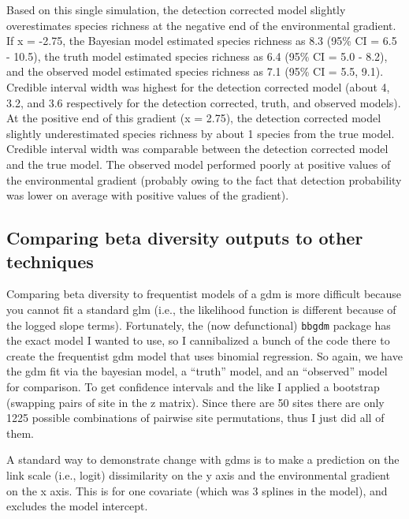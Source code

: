\documentclass[
]{article}
\begin{document}
Based on this single simulation, the detection corrected model slightly
overestimates species richness at the negative end of the environmental
gradient. If x = -2.75, the Bayesian model estimated species richness as
8.3 (95\% CI = 6.5 - 10.5), the truth model estimated species richness
as 6.4 (95\% CI = 5.0 - 8.2), and the observed model estimated species
richness as 7.1 (95\% CI = 5.5, 9.1). Credible interval width was
highest for the detection corrected model (about 4, 3.2, and 3.6
respectively for the detection corrected, truth, and observed models).
At the positive end of this gradient (x = 2.75), the detection corrected
model slightly underestimated species richness by about 1 species from
the true model. Credible interval width was comparable between the
detection corrected model and the true model. The observed model
performed poorly at positive values of the environmental gradient
(probably owing to the fact that detection probability was lower on
average with positive values of the gradient).

\hypertarget{comparing-beta-diversity-outputs-to-other-techniques}{%
\subsection{Comparing beta diversity outputs to other
techniques}\label{comparing-beta-diversity-outputs-to-other-techniques}}

Comparing beta diversity to frequentist models of a gdm is more
difficult because you cannot fit a standard glm (i.e., the likelihood
function is different because of the logged slope terms). Fortunately,
the (now defunctional) \texttt{bbgdm} package has the exact model I
wanted to use, so I cannibalized a bunch of the code there to create the
frequentist gdm model that uses binomial regression. So again, we have
the gdm fit via the bayesian model, a ``truth'' model, and an
``observed'' model for comparison. To get confidence intervals and the
like I applied a bootstrap (swapping pairs of site in the z matrix).
Since there are 50 sites there are only 1225 possible combinations of
pairwise site permutations, thus I just did all of them.

A standard way to demonstrate change with gdms is to make a prediction
on the link scale (i.e., logit) dissimilarity on the y axis and the
environmental gradient on the x axis. This is for one covariate (which
was 3 splines in the model), and excludes the model intercept.
\end{document}
